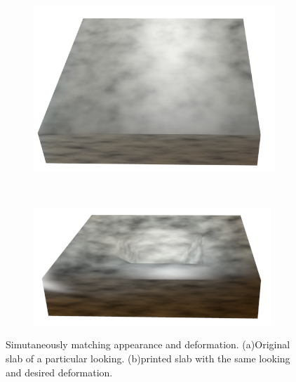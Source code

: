 \documentclass[annual]{acmsiggraph}
\begin{document}
\begin{figure}
\begin{subfigure}[b]{0.3\textwidth}
	\centering
 	\includegraphics[width=\textwidth]{figure/slab_origin.png}
   	\caption{}
    \label{fig:deformPhoto}
    \end{subfigure}
    ~
    \begin{subfigure}[b]{0.3\textwidth}
    \centering
  	\includegraphics[width=\textwidth]{figure/slab_deform.png}
    \caption{}
    \label{fig:deformPrint}
\end{subfigure}
\caption{Simutaneously matching appearance and deformation.
(a)Original slab of a particular looking. (b)printed slab
with the same looking and desired deformation.}
\label{fig:deform}
\end{figure}
\end{document}
